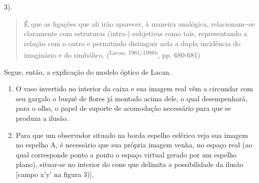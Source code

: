 \begin{multicols}{2}
3)\allowbreak{}.\allowbreak{}\par{}
\par
{
}
\par
\begin{quote}\par{}É que as ligações que ali irão aparecer,\allowbreak{} à maneira analógica,\allowbreak{} relacionam-\allowbreak{}-\allowbreak{}se claramente com estruturas (\allowbreak{}intra-\allowbreak{})\allowbreak{} subjetivas como tais,\allowbreak{} representando a relação com o outro e permitindo distinguir nela a dupla incidência do imaginário e do simbólico.\allowbreak{} (\allowbreak{}\textsuperscript{Lacan,\allowbreak{} 1961\fshyp{}1998b},\allowbreak{} pp.\allowbreak{} 680-\allowbreak{}681)\allowbreak{}\end{quote}\par{}Segue,\allowbreak{} então,\allowbreak{} a explicação do modelo óptico de Lacan.\allowbreak{}
\begin{enumerate}[label=\arabic*,leftmargin=*]
\item \par{}O vaso invertido no interior da caixa e sua imagem real vêm a circundar com seu gargalo o buquê de flores já montado acima dele,\allowbreak{} o qual desempenhará,\allowbreak{} para o olho,\allowbreak{} o papel de suporte de acomodação necessário para que se produza a ilusão.\allowbreak{}
\item \par{}Para que um observador situado na borda espelho esférico veja sua imagem no espelho A,\allowbreak{} é necessário que sua própria imagem venha,\allowbreak{} no espaço real (\allowbreak{}ao qual corresponde ponto a ponto o espaço virtual gerado por um espelho plano)\allowbreak{},\allowbreak{} situar-\allowbreak{}se no interior do cone que delimita a possibilidade da ilusão [campo x’y’ na figura 3)\allowbreak{}].\allowbreak{}
\end{enumerate}



\end{multicols}
